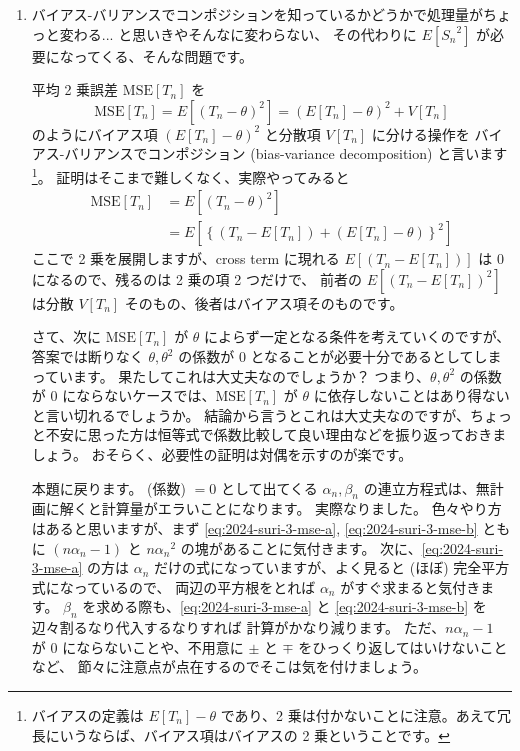 \documentclass[./main.tex]{subfiles}
\begin{document}
\begin{enumerate}
        \item バイアス-バリアンスでコンポジションを知っているかどうかで処理量がちょっと変わる... と思いきやそんなに変わらない、
        その代わりに $E[ {S_n}^2]$ が必要になってくる、そんな問題です。

        平均 2 乗誤差 $\mathrm{MSE} [T_n]$ を
        \begin{equation*}
            \mathrm{MSE} [T_n] 
                = E [ (T_n - \theta)^2 ] 
                    = ( E [ T_n] - \theta )^2 + V [T_n]
        \end{equation*}
        のようにバイアス項 $(E [ T_n ] - \theta)^2$ と分散項 $V [T_n]$ に分ける操作を
         バイアス-バリアンスでコンポジション (bias-variance decomposition) と言います
        \footnote{バイアスの定義は $E [ T_n ] - \theta$ であり、2 乗は付かないことに注意。あえて冗長にいうならば、バイアス項はバイアスの 2 乗ということです。}。
        証明はそこまで難しくなく、実際やってみると
        \begin{align*}
            \mathrm{MSE} [T_n] 
                &= E [ (T_n - \theta)^2 ] \\
                &= E \left[ \left\{ (T_n - E[ T_n ]) + ( E[ T_n ] - \theta) \right\}^2 \right]
        \end{align*}
        ここで 2 乗を展開しますが、cross term に現れる $E[ ( T_n - E [T_n] ) ]$ は $0$ になるので、残るのは 2 乗の項 2 つだけで、
        前者の $E [ (T_n - E[T_n])^2 ]$ は分散 $V [T_n]$ そのもの、後者はバイアス項そのものです。

        さて、次に $\mathrm{MSE} [T_n]$ が $\theta$ によらず一定となる条件を考えていくのですが、
        答案では断りなく $\theta, \theta^2$ の係数が $0$ となることが必要十分であるとしてしまっています。
        果たしてこれは大丈夫なのでしょうか？
        つまり、$\theta, \theta^2$ の係数が $0$ にならないケースでは、$\mathrm{MSE} [T_n]$ が $\theta$ に依存しないことはあり得ないと言い切れるでしょうか。
        結論から言うとこれは大丈夫なのですが、ちょっと不安に思った方は恒等式で係数比較して良い理由などを振り返っておきましょう。
        おそらく、必要性の証明は対偶を示すのが楽です。

        本題に戻ります。
        (係数) $= 0 $ として出てくる $\alpha_n, \beta_n$ の連立方程式は、無計画に解くと計算量がエラいことになります。
        実際なりました。
        色々やり方はあると思いますが、まず \eqref{eq:2024-suri-3-mse-a}, \eqref{eq:2024-suri-3-mse-b} ともに
        $(n \alpha_n - 1)$ と $n {\alpha_n}^2$ の塊があることに気付きます。
        次に、\eqref{eq:2024-suri-3-mse-a} の方は $\alpha_n$ だけの式になっていますが、よく見ると (ほぼ) 完全平方式になっているので、
        両辺の平方根をとれば $\alpha_n$ がすぐ求まると気付きます。
        $\beta_n$ を求める際も、\eqref{eq:2024-suri-3-mse-a} と \eqref{eq:2024-suri-3-mse-b} を辺々割るなり代入するなりすれば
        計算がかなり減ります。
        ただ、$n \alpha_n - 1$ が $0$ にならないことや、不用意に $\pm$ と $\mp$ をひっくり返してはいけないことなど、
        節々に注意点が点在するのでそこは気を付けましょう。


\end{enumerate}
\end{document}
